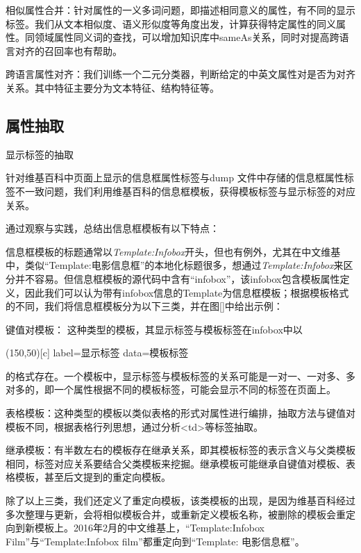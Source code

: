 {\heiti 相似属性合并：}针对属性的一义多词问题，即描述相同意义的属性，有不同的显示标签。我们从文本相似度、语义形似度等角度出发，计算获得特定属性的同义属性。同领域属性同义词的查找，可以增加知识库中sameAs关系，同时对提高跨语言对齐的召回率也有帮助。

{\heiti 跨语言属性对齐：}我们训练一个二元分类器，判断给定的中英文属性对是否为对齐关系。其中特征主要分为文本特征、结构特征等。

\subsection{属性抽取}
\label{sec:property-extraction}

显示标签的抽取

针对维基百科中页面上显示的信息框属性标签与dump 文件中存储的信息框属性标签不一致问题，我们利用维基百科的信息框模板，获得模板标签与显示标签的对应关系。

通过观察与实践，总结出信息框模板有以下特点：

信息框模板的标题通常以\textit{Template:Infobox}开头，但也有例外，尤其在中文维基中，类似“Template:电影信息框”的本地化标题很多，想通过\textit{Template:Infobox}来区分并不容易。但信息框模板的源代码中含有“infobox”，该infobox包含模板属性定义，因此我们可以认为带有infobox信息的Template为信息框模板；根据模板格式的不同，我们将信息框模板分为以下三类，并在图\ref{}中给出示例：

{\heiti 键值对模板：} 这种类型的模板，其显示标签与模板标签在infobox中以

\begin{table}[ht]
  \begin{minipage}{0.4\linewidth}
    \centering
    \caption*{}
    \label{tab:key-value}
      \framebox(150,50)[c]{ label=显示标签 data=模板标签 }
  \end{minipage}%
  \hfill%
\end{table}

的格式存在。一个模板中，显示标签与模板标签的关系可能是一对一、一对多、多对多的，即一个属性根据不同的模板标签，可能会显示不同的标签在页面上。

{\heiti 表格模板：}这种类型的模板以类似表格的形式对属性进行编排，抽取方法与键值对模板不同，根据表格行列思想，通过分析<td>等标签抽取。

{\heiti 继承模板：}有半数左右的模板存在继承关系，即其模板标签的表示含义与父类模板相同，标签对应关系要结合父类模板来挖掘。继承模板可能继承自键值对模板、表格模板，甚至后文提到的重定向模板。

除了以上三类，我们还定义了{\heiti 重定向模板}，该类模板的出现，是因为维基百科经过多次整理与更新，会将相似模板合并，或重新定义模板名称，被删除的模板会重定向到新模板上。2016年2月的中文维基上，“Template:Infobox Film”与“Template:Infobox film”都重定向到“Template: 电影信息框”。

